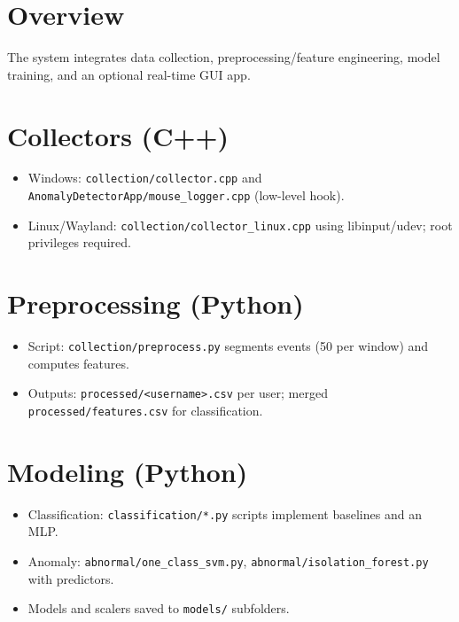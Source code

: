 \documentclass[
  12pt,
  a4paper,
]{report}
\providecommand{\tightlist}{%
  \setlength{\itemsep}{0pt}\setlength{\parskip}{0pt}}
\begin{document}
\section{Overview}\label{overview}

The system integrates data collection, preprocessing/feature
engineering, model training, and an optional real-time GUI app.

\section{Collectors (C++)}\label{collectors-c}

\begin{itemize}
\tightlist
\item
  Windows: \texttt{collection/collector.cpp} and
  \texttt{AnomalyDetectorApp/mouse\_logger.cpp} (low-level hook).
\item
  Linux/Wayland: \texttt{collection/collector\_linux.cpp} using
  libinput/udev; root privileges required.
\end{itemize}

\section{Preprocessing (Python)}\label{preprocessing-python}

\begin{itemize}
\tightlist
\item
  Script: \texttt{collection/preprocess.py} segments events (50 per
  window) and computes features.
\item
  Outputs: \texttt{processed/\textless{}username\textgreater{}.csv} per
  user; merged \texttt{processed/features.csv} for classification.
\end{itemize}

\section{Modeling (Python)}\label{modeling-python}

\begin{itemize}
\tightlist
\item
  Classification: \texttt{classification/*.py} scripts implement
  baselines and an MLP.
\item
  Anomaly: \texttt{abnormal/one\_class\_svm.py},
  \texttt{abnormal/isolation\_forest.py} with predictors.
\item
  Models and scalers saved to \texttt{models/} subfolders.
\end{itemize}
\end{document}
